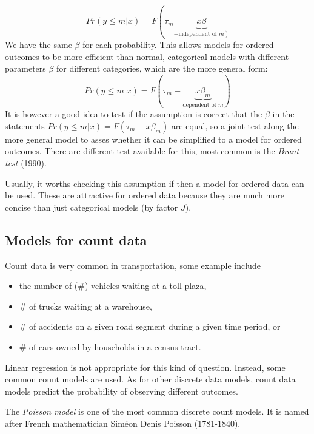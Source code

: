 				\begin{equation*}
					Pr(y\leq m|x)=F\left(\right.\tau_m \underbrace{x\beta}_{-\text{independent of }m\left. \right)}
				\end{equation*}
				We have the same $\beta$ for each probability. This allows models for ordered outcomes to be more efficient than normal, categorical models with different parameters $\beta$ for different categories, which are the more general form:
				\begin{equation*}
					Pr(y\leq m|x)=F(\tau_m-\underbrace{x\beta_m}_{\text{dependent of }m})
				\end{equation*}		
				It is however a good idea to test if the assumption is correct that the $\beta$ in the statements $Pr(y\leq m|x)=F(\tau_m-x\beta_m)$ are equal, so a joint test along the more general model to asses whether it can be simplified to a model for ordered outcomes. There are different test available for this, most common is the \textit{Brant test} (1990).%
				
				Usually, it worths checking this assumption if then a model for ordered data can be used. These are attractive for ordered data because they are much more concise than just categorical models (by factor $J$).
	\subsection{Models for count data}		
		Count data is very common in transportation, some example include
		\begin{itemize}
			\item the number of (\#) vehicles waiting at a toll plaza,
			\item \# of trucks waiting at a warehouse,
			\item \# of accidents on a given road segment during a given time period, or
			\item \# of cars owned by households in a census tract.
		\end{itemize}
		Linear regression is not appropriate for this kind of question. Instead, some common count models are used. As for other discrete data models, count data models predict the probability of observing different outcomes.
		
			The \emph{Poisson model} is one of the most common discrete count models. It is named after French mathematician Siméon Denis Poisson (1781-1840).
